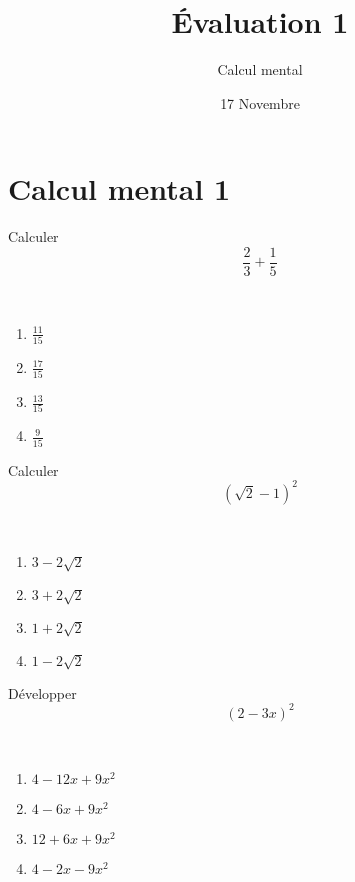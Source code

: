\documentclass[17pt,xcolor=x11names]{beamer}
\begin{document}
\begin{frame}
  \title{Évaluation 1}
  \author{Calcul mental}
\date{17 Novembre}
\titlepage
\end{frame}

\section{Calcul mental 1}

\begin{frame}
  \begin{center}
    Calculer
    \[
      \frac{2}{3}+\frac{1}{5}
    \]
  \end{center}~\\
  \begin{multicols}{2}
    \begin{enumerate}[label=(\Alph*)]
      \item $\frac{11}{15}$
      \item $\frac{17}{15}$
      \item $\frac{13}{15}$
      \item $\frac{9}{15}$
    \end{enumerate}
  \end{multicols}
\end{frame}

\begin{frame}
  \begin{center}
    Calculer
    \[
      (\sqrt2-1)^2
    \]
  \end{center}~\\
  \begin{multicols}{2}
    \begin{enumerate}[label=(\Alph*)]
      \item $3-2\sqrt2$
      \item $3+2\sqrt2$
      \item $1+2\sqrt2$
      \item $1-2\sqrt2$
    \end{enumerate}
  \end{multicols}
\end{frame}

\begin{frame}
  \begin{center}
    Développer
    \[
      (2-3x)^2
    \]
  \end{center}~\\
  \begin{multicols}{2}
    \begin{enumerate}[label=(\Alph*)]
      \item $4-12x+9x^2$
      \item $4-6x+9x^2$
      \item $12+6x+9x^2$
      \item $4-2x-9x^2$
    \end{enumerate}
  \end{multicols}
\end{frame}
\end{document}
